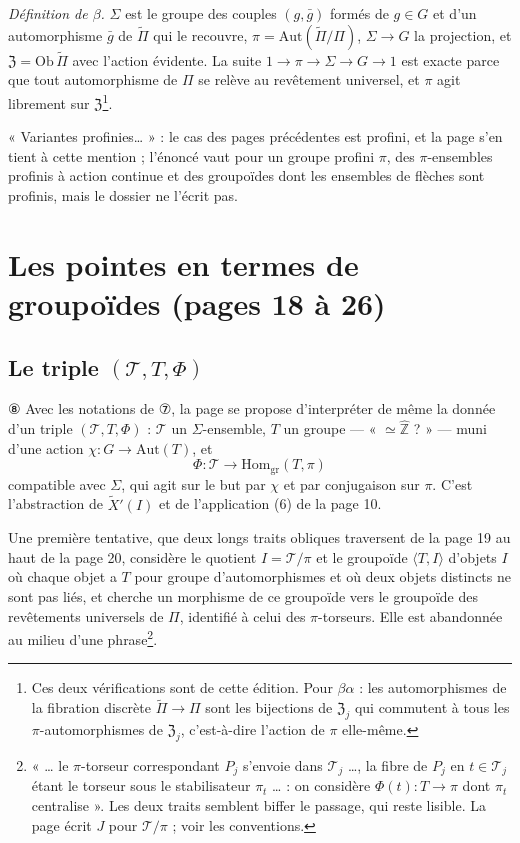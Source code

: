 \documentclass[11pt,a4paper]{article}
\begin{document}
\emph{Définition de $\beta$.} $\Sigma$ est le groupe des couples $(g,
\bar g)$ formés de $g \in G$ et d'un automorphisme $\bar g$ de $\widetilde\Pi$
qui le recouvre, $\pi = \mathrm{Aut}(\widetilde\Pi/\Pi)$, $\Sigma \to G$ la
projection, et $\mathfrak{Z} = \mathrm{Ob}\,\widetilde\Pi$ avec l'action
évidente. La suite $1 \to \pi \to \Sigma \to G \to 1$ est exacte parce que tout
automorphisme de $\Pi$ se relève au revêtement universel, et $\pi$ agit
librement sur $\mathfrak{Z}$\footnote{Ces deux vérifications sont de cette
édition. Pour $\beta\alpha$ : les automorphismes de la fibration discrète
$\widetilde\Pi \to \Pi$ sont les bijections de $\mathfrak{Z}_j$ qui commutent à
tous les $\pi$-automorphismes de $\mathfrak{Z}_j$, c'est-à-dire l'action de
$\pi$ elle-même.}.

« Variantes profinies… » : le cas des pages précédentes est profini, et la
page s'en tient à cette mention ; l'énoncé vaut pour un groupe profini $\pi$,
des $\pi$-ensembles profinis à action continue et des groupoïdes dont les
ensembles de flèches sont profinis, mais le dossier ne l'écrit pas.

\section*{Les pointes en termes de groupoïdes (pages 18 à 26)}

\subsection*{Le triple $(\mathcal{T}, T, \Phi)$}

⑧ Avec les notations de ⑦, la page se propose d'interpréter de même la donnée
d'un triple $(\mathcal{T}, T, \Phi)$ : $\mathcal{T}$ un $\Sigma$-ensemble, $T$
un groupe — « $\simeq \widehat{\mathbb{Z}}$ ? » — muni d'une action $\chi : G
\to \mathrm{Aut}(T)$, et
\[
\Phi : \mathcal{T} \longrightarrow \mathrm{Hom}_{\mathrm{gr}}(T, \pi)
\]
compatible avec $\Sigma$, qui agit sur le but par $\chi$ et par conjugaison sur
$\pi$. C'est l'abstraction de $\widetilde X'(I)$ et de l'application (6) de la
page 10.

Une première tentative, que deux longs traits obliques traversent de la page
19 au haut de la page 20, considère le quotient $I = \mathcal{T}/\pi$ et le
groupoïde $\langle T, I\rangle$ d'objets $I$ où chaque objet a $T$ pour groupe
d'automorphismes et où deux objets distincts ne sont pas liés, et cherche un
morphisme de ce groupoïde vers le groupoïde des revêtements universels de
$\Pi$, identifié à celui des $\pi$-torseurs. Elle est abandonnée au milieu
d'une phrase\footnote{« … le $\pi$-torseur correspondant $P_j$ s'envoie dans
$\mathcal{T}_j$ …, la fibre de $P_j$ en $t \in \mathcal{T}_j$ étant le torseur
sous le stabilisateur $\pi_t$ … : on considère $\Phi(t) : T \to \pi$ dont
$\pi_t$ centralise ». Les deux traits semblent biffer le passage, qui reste
lisible. La page écrit $J$ pour $\mathcal{T}/\pi$ ; voir les conventions.}.
\end{document}
